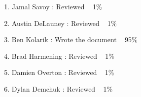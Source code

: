 \documentclass{article}
\begin{document}
\begin{addmargin}[2em]{0em}
\begin{enumerate}

\item Jamal Savoy : Reviewed ~ 1\%

\item Austin DeLauney : Reviewed ~ 1\%

\item Ben Kolarik : Wrote the document ~ 95\%

\item Brad Harmening : Reviewed ~ 1\%

\item Damien Overton : Reviewed ~ 1\%

\item Dylan Demchuk : Reviewed ~ 1\%

\end{enumerate}
\end{addmargin}
\end{document}
